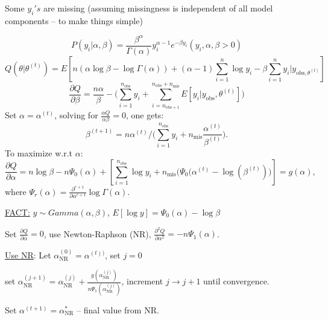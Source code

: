 \documentclass[12pt,letterpaper]{article}
\begin{document}
Some $y_{i}'s$ are missing (assuming missingness is independent of all model components -- to make things simple)

\[P(y_i|\alpha,\beta) = \frac{\beta^\alpha}{\Gamma(\alpha)}y_i^{\alpha-1}e^{-\beta y_i}(y_i,\alpha,\beta>0)\]
\[Q(\theta|\theta^{(t)}) = E[n(\alpha \log \beta - \log \Gamma(\alpha) ) + (\alpha-1)\sum^{n}_{i=1}\log y_i -\beta \sum_{i=1}^n y_i|y_{\text{obs},\theta^{(t)}}]\]
\[\frac{\partial Q}{\partial \beta}=\frac{n\alpha}{\beta}-\big(\sum_{i=1}^{n_{\text{obs}}}y_i+\sum_{i=n_{\text{obs}+1}}^{n_{\text{obs}}+n_{\text{mis}}}E[y_i|y_{\text{obs}},\theta^{(t)}]\big)\]
Set $\alpha = \alpha^{(t)}$, solving for $\frac{\alpha Q}{\alpha \beta}=0$, one gets:
\[\beta^{(t+1)} = n\alpha^{(t)}/\big(\sum_{i=1}^{n_{\text{obs}}}y_i + n_{\text{mis}} \frac{\alpha^{(t)}}{\beta^{(t)}}\big).\]
To maximize w.r.t $\alpha$:
\[\frac{\partial Q}{\partial \alpha}= n \log \beta - n \Psi_0(\alpha) + [\sum_{i=1}^{n_{\text{obs}}}\log y_i+ n_{\text{mis}}\big(\Psi_0(\alpha^{(t)} - \log(\beta^{(t)})\big)]=g(\alpha),\]
where $\Psi_r(\alpha) = \frac{\partial ^ {r+1}}{\partial \alpha^{r+1}}\log \Gamma (\alpha)$. 


\vspace{0.1in}
\underline{FACT:} $y \sim Gamma(\alpha,\beta)$, $E[\log y] = \Psi_0(\alpha) - \log \beta$

\vspace{0.1in}
Set $\frac{\partial Q}{\partial \alpha}=0$, use Newton-Raphson (NR), $\frac{\partial ^2 Q}{\partial \alpha^2}= - n \Psi_1(\alpha)$.

\underline{Use NR}: Let $\alpha_{\text{NR}}^{(0)} = \alpha^{(t))}$, set $j=0$ 

set $\alpha_{\text{NR}}^{(j+1)} = \alpha_{\text{NR}}^{(j)}  + \frac{g(\alpha_{\text{NR}}^{(j)})}{n\Psi_1(\alpha_{\text{NR}}^{(j)})}$, increment $j\rightarrow j+1$ until convergence.

Set $\alpha^{(t+1)} = \alpha_{\text{NR}}^{*}$ -- final value from NR.
\end{document}
